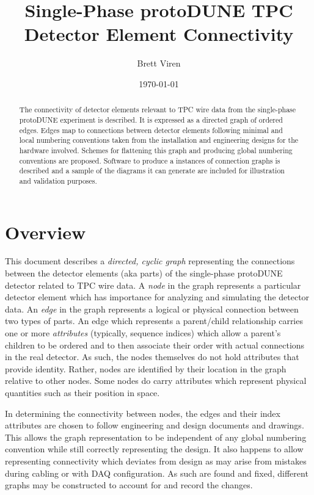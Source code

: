 \documentclass[pdftex,12pt,letter]{article}
\author{Brett Viren}
\date{\today}
\title{Single-Phase protoDUNE TPC \\ Detector Element Connectivity}
\begin{document}
\maketitle

\begin{abstract}
  \noindent The connectivity of detector elements relevant to TPC wire
  data from the single-phase protoDUNE experiment is described.  It is
  expressed as a directed graph of ordered edges.  Edges map to
  connections between detector elements following minimal and local
  numbering conventions taken from the installation and engineering
  designs for the hardware involved.  Schemes for flattening this
  graph and producing global numbering conventions are proposed.
  Software to produce a instances of connection graphs is described
  and a sample of the diagrams it can generate are included for
  illustration and validation purposes.
\end{abstract}

\tableofcontents
\newpage
\section{Overview}

This document describes a \textit{directed, cyclic graph} representing
the connections between the detector elements (aka parts) of the
single-phase protoDUNE detector related to TPC wire data.  A
\textit{node} in the graph represents a particular detector element
which has importance for analyzing and simulating the detector data.
An \textit{edge} in the graph represents a logical or physical
connection between two types of parts.  An edge which represents a
parent/child relationship carries one or more \textit{attributes}
(typically, sequence indices) which allow a parent's children to be ordered and
to then associate their order with actual connections in the real
detector.  As such, the nodes themselves do not hold attributes that
provide identity.  Rather, nodes are identified by their location in
the graph relative to other nodes.  Some nodes do carry attributes
which represent physical quantities such as their position in space.

In determining the connectivity between nodes, the edges and their
index attributes are chosen to follow engineering and design documents and
drawings.  This allows the graph representation to be independent of
any global numbering convention while still correctly representing the
design.  It also happens to allow representing connectivity which
deviates from design as may arise from mistakes during cabling or with
DAQ configuration.  As such are found and fixed, different graphs may
be constructed to account for and record the changes.
\end{document}
